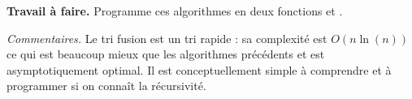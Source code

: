 \documentclass[11pt,class=report,crop=false]{standalone}
\begin{document}
\begin{activite}


\bigskip

\textbf{Travail à faire.} Programme ces algorithmes en deux fonctions  et .

\bigskip

\emph{Commentaires.} Le tri fusion est un tri rapide : sa complexité est $O(n\ln(n))$ ce qui est beaucoup mieux que les algorithmes précédents et est asymptotiquement optimal.
Il est conceptuellement simple à comprendre et à programmer si on connaît la récursivité.
	
\end{activite}


\end{document}
